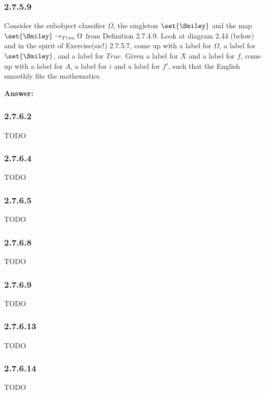 \documentclass{article}
\newcommand{\vsp}[0]{\vspace*{10pt}\par}
\newcommand{\exercise}[1]{\subsubsection*{#1}}
\newcommand{\ans}[0]{\vsp\textbf{Answer: }\vsp}
\begin{document}
\exercise{2.7.5.9}

Consider the subobject classifier $\Omega$, the singleton $\set{\Smiley}$ and
the map $\set{\Smiley} \to_{True} \Omega$ from Definition 2.7.4.9. Look at
diagram 2.44 (below) and in the spirit of Exercise(sic!) 2.7.5.7, come up with a
label for $\Omega$, a label for $\set{\Smiley}$, and a label for $True$. Given a
label for $X$ and a label for $f$, come up with a label for $A$, a label for $i$
and a label for $f'$, such that the English smoothly fits the mathematics.


\begin{center}
\end{center}

\ans


\begin{center}
\end{center}

\exercise{2.7.6.2}

TODO

\exercise{2.7.6.4}

TODO

\exercise{2.7.6.5}

TODO

\exercise{2.7.6.8}

TODO

\exercise{2.7.6.9}

TODO

\exercise{2.7.6.13}

TODO

\exercise{2.7.6.14}

TODO

\vsp
\vsp
\vsp
\vsp

\printbibliography
\end{document}
